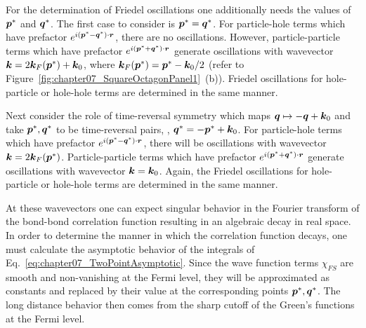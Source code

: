 For the determination of Friedel oscillations one additionally needs the values of $\bm{p}^*$ and $\bm{q}^*$.
The first case to consider is $\bm{p}^* = \bm{q}^*$.
For particle-hole terms which have prefactor $e^{i(\bm{p}^* - \bm{q}^*)\cdot\bm{r}}$, there are no oscillations.
However, particle-particle terms which have prefactor $e^{i(\bm{p}^* + \bm{q}^*)\cdot\bm{r}}$ generate oscillations with wavevector $\bm{k} = 2\bm{k}_F(\bm{p}^*) + \bm{k}_0$, where $\bm{k}_F(\bm{p}^*) = \bm{p}^* - \bm{k}_0/2$ (refer to Figure~\ref{fig:chapter07_SquareOctagonPanel1}~(b)).
Friedel oscillations for hole-particle or hole-hole terms are determined in the same manner.

Next consider the role of time-reversal symmetry which maps $\bm{q} \mapsto -\bm{q} + \bm{k}_0$ and take $\bm{p}^*, \bm{q}^*$ to be time-reversal pairs, \ie, $\bm{q}^* = -\bm{p}^* + \bm{k}_0$.
For particle-hole terms which have prefactor $e^{i(\bm{p}^* - \bm{q}^*)\cdot\bm{r}}$, there will be oscillations with wavevector $\bm{k} = 2\bm{k}_F(\bm{p}^*)$.
Particle-particle terms which have prefactor $e^{i(\bm{p}^* + \bm{q}^*)\cdot\bm{r}}$ generate oscillations with wavevector $\bm{k} = \bm{k}_0$.
Again, the Friedel oscillations for hole-particle or hole-hole terms are determined in the same manner.

At these wavevectors one can expect singular behavior in the Fourier transform of the bond-bond correlation function resulting in an algebraic decay in real space.
In order to determine the manner in which the correlation function decays, one must calculate the asymptotic behavior of the integrals of Eq.~\eqref{eq:chapter07_TwoPointAsymptotic}.
Since the wave function terms $\chi_{FS}$ are smooth and non-vanishing at the Fermi level, they will be approximated as constants and replaced by their value at the corresponding points $\bm{p}^*, \bm{q}^*$.
The long distance behavior then comes from the sharp cutoff of the Green's functions at the Fermi level.

